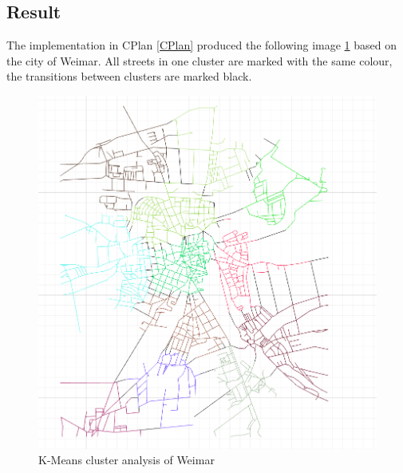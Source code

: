 \documentclass[11pt, a4paper]{report}
\begin{document}
\subsection{Result}
The implementation in CPlan \ref{CPlan} produced the following image \ref{fig:KmeansGenerated} based on the city of Weimar. All streets in one cluster are marked with the same colour, the transitions between clusters are marked black.
\begin{figure}[!h]
    \centering
    \includegraphics[width=\textwidth]{clusteranalysis_kmeans_result.png}
    \caption{K-Means cluster analysis of Weimar\label{fig:KmeansGenerated}}
\end{figure}
\end{document}
